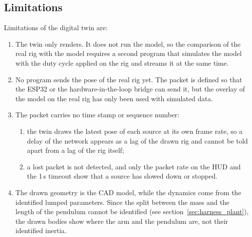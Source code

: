 \documentclass[a4paper,11pt]{article}
\begin{document}
\subsection{Limitations}
Limitations of the digital twin are:
\begin{enumerate}
  \item The twin only renders. It does not run the model, so the comparison of the real rig with the model requires a second program that simulates the model with the duty cycle applied on the rig and streams it at the same time.
  \item No program sends the pose of the real rig yet. The packet is defined so that the ESP32 or the hardware-in-the-loop bridge can send it, but the overlay of the model on the real rig has only been used with simulated data.
  \item The packet carries no time stamp or sequence number:
  \begin{enumerate}
    \item the twin draws the latest pose of each source at its own frame rate, so a delay of the network appears as a lag of the drawn rig and cannot be told apart from a lag of the rig itself;
    \item a lost packet is not detected, and only the packet rate on the HUD and the 1\,s timeout show that a source has slowed down or stopped.
  \end{enumerate}
  \item The drawn geometry is the CAD model, while the dynamics come from the identified lumped parameters. Since the split between the mass and the length of the pendulum cannot be identified (see section~\ref{sec:harness_plant}), the drawn bodies show where the arm and the pendulum are, not their identified inertia.
\end{enumerate}
\end{document}

